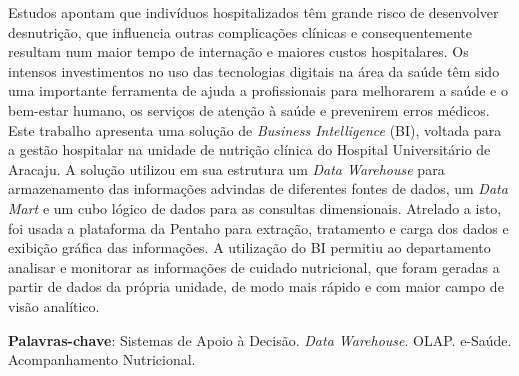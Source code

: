 \setlength{\absparsep}{18pt} %
\begin{resumo}
 
Estudos apontam que indivíduos hospitalizados têm grande risco de desenvolver desnutrição, que influencia outras complicações clínicas e consequentemente resultam num maior tempo de internação e maiores custos hospitalares. Os intensos investimentos no uso das tecnologias digitais na área da saúde têm sido uma importante ferramenta de ajuda a profissionais para melhorarem a saúde e o bem-estar humano, os serviços de atenção à saúde e prevenirem erros médicos. Este trabalho apresenta uma solução de \textit{Business Intelligence} (BI), voltada para a gestão hospitalar na unidade de nutrição clínica do Hospital Universitário de Aracaju. A solução utilizou em sua estrutura um \textit{Data Warehouse} para armazenamento das informações advindas de diferentes fontes de dados, um \textit{Data Mart} e um cubo lógico de dados para as consultas dimensionais. Atrelado a isto, foi usada a plataforma da Pentaho para extração, tratamento e carga dos dados e exibição gráfica das informações. A utilização do BI permitiu ao departamento analisar e monitorar as informações de cuidado nutricional, que foram geradas a partir de dados da própria unidade, de modo mais rápido e com maior campo de visão analítico. 

 \textbf{Palavras-chave}: Sistemas de Apoio à Decisão. \textit{Data Warehouse}. OLAP. e-Saúde. Acompanhamento Nutricional.
\end{resumo}